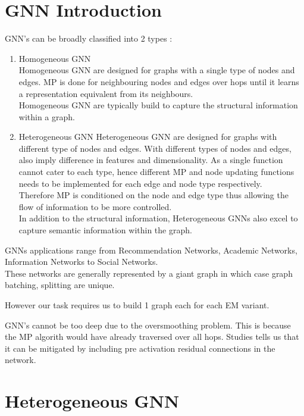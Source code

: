 \documentclass{report} %
\begin{document}
\section{\ac{GNN} Introduction}\label{sec:GNN Introduction}
\ac{GNN}'s can be broadly classified into 2 types :
\begin{enumerate}
    \item Homogeneous \ac{GNN} \\
        Homogeneous \ac{GNN} are designed for graphs with a single type of nodes and edges. \ac{MP} is done for neighbouring nodes and edges over hops until it learns a representation equivalent from its neighbours.\\
        Homogeneous \ac{GNN} are typically build to capture the structural information within a graph.\\
    \item Heterogeneous \ac{GNN}    
        Heterogeneous \ac{GNN} are designed for graphs with different type of nodes and edges. With different types of nodes and edges, also imply difference in features and dimensionality.
        As a single function cannot cater to each type, hence different \ac{MP} and node updating functions needs to be implemented for each edge and node type respectively.\\
        Therefore \ac{MP} is conditioned on the node and edge type thus allowing the flow of information to be more controlled. \\
        In addition to the structural information, Heterogeneous \ac{GNN}s also excel to capture semantic information within the graph.\\
\end{enumerate}

\ac{GNN}s applications range from Recommendation Networks, Academic Networks, Information Networks to Social Networks.\\
These networks are generally represented by a giant graph in which case graph batching, splitting are unique.

However our task requires us to build 1 graph each for each \ac{EM} variant.

\ac{GNN}'s cannot be too deep due to the oversmoothing problem. This is because the \ac{MP} algorith would have already traversed over all hops.
Studies tells us that it can be mitigated by including pre activation residual connections in the network.\\

\section{Heterogeneous \ac{GNN}}\label{sec:Heterogeneous GNN}
\end{document}
